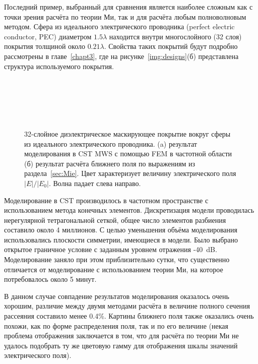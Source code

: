 Последний пример, выбранный для сравнения является наиболее сложным
как с точки зрения расчёта по теории Ми, так и для расчёта любым
полноволновым методом. Сфера из идеального электрического проводника
(perfect electric conductor, PEC) диаметром $1.5\lambda$ находится
внутри многослойного (32 слоя) покрытия толщиной около
$0.21\lambda$. Свойства таких покрытий будут подробно рассмотрены в
главе~\ref{chapt3}, где на рисунке~\ref{img:designs}(б) представлена
структура используемого покрытия. 
\begin{figure}[p] %
  \begin{minipage}[ht]{0.99\linewidth}        
  \end{minipage}\\
  \vfill
  \begin{minipage}[ht]{0.99\linewidth}        
  \end{minipage}\\
  \vfill
  \begin{minipage}[ht]{0.95\linewidth}
  \end{minipage}\\
  \vfill
  \begin{minipage}[ht]{0.99\linewidth}
  \end{minipage}
  \caption{32-слойное диэлектрическое маскирующее покрытие вокруг
    сферы из идеального электрического проводника. (a) результат моделирования в CST
    MWS с помощью FEM  в частотной области (б)
    результат расчёта ближнего поля по выражениям из
    раздела~\ref{sec:Mie}. Цвет характеризует величину электрического
    поля $|E|/|E_0|$. Волна падает слева направо.\label{img:e32layer}}
\end{figure}

Моделирование в CST производилось в частотном пространстве с
использованием метода конечных элементов. Дискретизация модели
проводилась нерегулярной тетрагональной сеткой, общее число элементов
разбиения составило около 4 миллионов.  С целью уменьшения объёма
моделирования использовались плоскости симметрии, имеющиеся в
модели. Было выбрано открытое граничное условие с заданным уровнем
отражения -40~dB. Моделирование заняло при этом приблизительно сутки,
что существенно отличается от моделирование с использованием теории
Ми, на которое потребовалось около 5 минут. 

В данном случае совпадение результатов моделирования оказалось очень
хорошим, различие между двумя методами расчёта в величине полного
сечения рассеяния составило менее 0.4\%. Картины ближнего поля также
оказались очень похожи, как по форме распределения поля, так и по его
величине (некая проблема отображения заключается в том, что для
расчёта по теории Ми не удалось подобрать ту же цветовую гамму для
отображения шкалы значений электрического поля).

